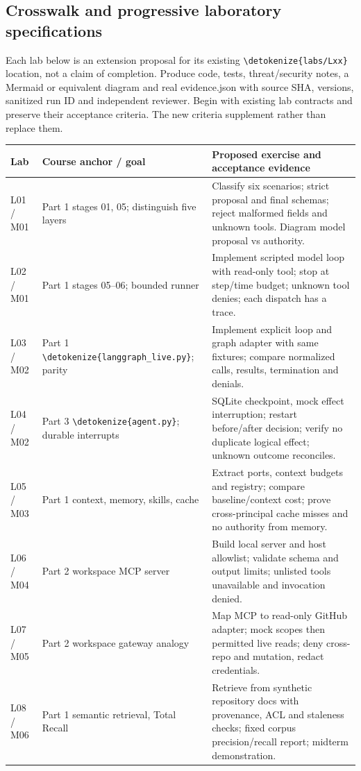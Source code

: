 \documentclass[11pt,letterpaper]{article}
\newcommand{\src}[1]{\expandafter\nolinkurl\expandafter{\detokenize{#1}}}
\begin{document}
\subsection{Crosswalk and progressive laboratory specifications}
Each lab below is an extension proposal for its existing \src{labs/Lxx} location, not a claim of completion. Produce code, tests, threat/security notes, a Mermaid or equivalent diagram and real evidence.json with source SHA, versions, sanitized run ID and independent reviewer. Begin with existing lab contracts and preserve their acceptance criteria. The new criteria supplement rather than replace them.
\begin{longtable}{>{\raggedright\arraybackslash}p{.10\linewidth}>{\raggedright\arraybackslash}p{.34\linewidth}>{\raggedright\arraybackslash}p{.47\linewidth}}\toprule
Lab & Course anchor / goal & Proposed exercise and acceptance evidence \\\midrule\endhead
L01 / M01 & Part 1 stages 01, 05; distinguish five layers & Classify six scenarios; strict proposal and final schemas; reject malformed fields and unknown tools. Diagram model proposal vs authority. \\
L02 / M01 & Part 1 stages 05--06; bounded runner & Implement scripted model loop with read-only tool; stop at step/time budget; unknown tool denies; each dispatch has a trace. \\
L03 / M02 & Part 1 \src{langgraph_live.py}; parity & Implement explicit loop and graph adapter with same fixtures; compare normalized calls, results, termination and denials. \\
L04 / M02 & Part 3 \src{agent.py}; durable interrupts & SQLite checkpoint, mock effect interruption; restart before/after decision; verify no duplicate logical effect; unknown outcome reconciles. \\
L05 / M03 & Part 1 context, memory, skills, cache & Extract ports, context budgets and registry; compare baseline/context cost; prove cross-principal cache misses and no authority from memory. \\
L06 / M04 & Part 2 workspace MCP server & Build local server and host allowlist; validate schema and output limits; unlisted tools unavailable and invocation denied. \\
L07 / M05 & Part 2 workspace gateway analogy & Map MCP to read-only GitHub adapter; mock scopes then permitted live reads; deny cross-repo and mutation, redact credentials. \\
L08 / M06 & Part 1 semantic retrieval, Total Recall & Retrieve from synthetic repository docs with provenance, ACL and staleness checks; fixed corpus precision/recall report; midterm demonstration. \\

\end{longtable}
\end{document}
